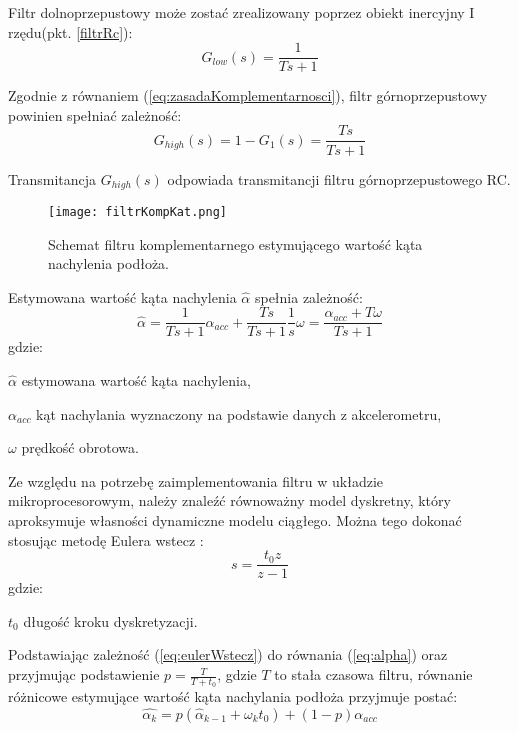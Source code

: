 Filtr dolnoprzepustowy może zostać zrealizowany poprzez obiekt inercyjny I rzędu(pkt. \ref{filtrRc}):
\begin{equation}
    G_{low}(s)=\frac{1}{Ts+1}
    \label{eq:lowPass}
\end{equation}

Zgodnie z równaniem (\ref{eq:zasadaKomplementarnosci}), filtr górnoprzepustowy powinien spełniać zależność:
\begin{equation}
    G_{high}(s)=1-G_{1}(s)=\frac{Ts}{Ts+1}
    \label{eq:highPass}
\end{equation}

Transmitancja $G_{high}(s)$ odpowiada transmitancji filtru górnoprzepustowego RC.

\begin{figure}[h]
    \centering
    \texttt{[image: filtrKompKat.png]}
    \caption{Schemat filtru komplementarnego estymującego wartość kąta nachylenia podłoża.}
    \label{fig:kompKat}
\end{figure}

Estymowana wartość kąta nachylenia $\hat{\alpha}$ spełnia zależność:
\begin{equation}
    \hat{\alpha} = \frac{1}{Ts+1}\alpha_{acc}+\frac{Ts}{Ts+1}\frac{1}{s}\omega = \frac{\alpha_{acc}+T\omega}{Ts + 1}
    \label{eq:alpha}
\end{equation}
gdzie:
\begin{eqwhere}[2cm]
	\item[$\hat{\alpha}$] estymowana wartość kąta nachylenia,
	\item[$\alpha_{acc}$] kąt nachylania wyznaczony na podstawie danych z akcelerometru,
	\item[$\omega$] prędkość obrotowa.
\end{eqwhere}

Ze względu na potrzebę zaimplementowania filtru w układzie mikroprocesorowym, należy znaleźć równoważny model dyskretny, który aproksymuje własności dynamiczne modelu ciągłego. Można tego dokonać stosując metodę Eulera wstecz \cite{grega}:
\begin{equation}
    s=\frac{t_0z}{z-1}
    \label{eq:eulerWstecz}
\end{equation}
gdzie:
\begin{eqwhere}[2cm]
	\item[$t_{0}$] długość kroku dyskretyzacji.
\end{eqwhere}

Podstawiając zależność (\ref{eq:eulerWstecz}) do równania (\ref{eq:alpha}) oraz przyjmując podstawienie $p = \frac{T}{T + t_0}$, gdzie $T$ to stała czasowa filtru,  równanie różnicowe estymujące wartość kąta nachylania podłoża przyjmuje postać:
\begin{equation}
    \hat{\alpha_{k}} = p(\hat{\alpha}_{k-1} + \omega_{k}t_0) + (1-p)\alpha_{acc}
\end{equation}
